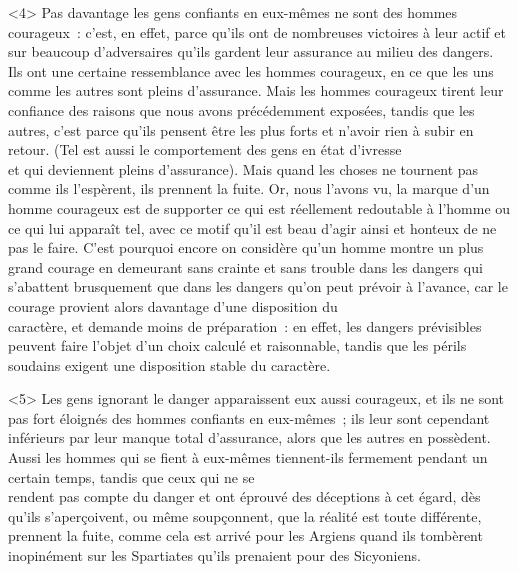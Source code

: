 \documentclass[french,twoside]{book} %
\begin{document}
<4> Pas davantage les gens confiants en eux-mêmes ne sont des hommes courageux : c’est, en effet, parce qu’ils ont de nombreuses victoires à leur actif et sur beaucoup d’adversaires qu’ils gardent leur assurance au milieu des dangers. Ils ont une certaine ressemblance avec les hommes courageux, en ce que les uns comme les autres sont pleins d’assurance. Mais les hommes courageux tirent leur confiance des raisons que nous avons précédemment exposées, tandis que les autres, c’est parce qu’ils pensent être les plus forts et n’avoir rien à subir en retour. (Tel est aussi le comportement des gens en état d’ivresse \\
et qui deviennent pleins d’assurance). Mais quand les choses ne tournent pas comme ils l’espèrent, ils prennent la fuite. Or, nous l’avons vu, la marque d’un homme courageux est de supporter ce qui est réellement redoutable à l’homme ou ce qui lui apparaît tel, avec ce motif qu’il est beau d’agir ainsi et honteux de ne pas le faire. C’est pourquoi encore on considère qu’un homme montre un plus grand courage en demeurant sans crainte et sans trouble dans les dangers qui s’abattent brusquement que dans les dangers qu’on peut prévoir à l’avance, car le courage provient alors davantage d’une disposition du \\
caractère, et demande moins de préparation : en effet, les dangers prévisibles peuvent faire l’objet d’un choix calculé et raisonnable, tandis que les périls soudains exigent une disposition stable du caractère.\par
<5> Les gens ignorant le danger apparaissent eux aussi courageux, et ils ne sont pas fort éloignés des hommes confiants en eux-mêmes ; ils leur sont cependant inférieurs par leur manque total d’assurance, alors que les autres en possèdent. Aussi les hommes qui se fient à eux-mêmes tiennent-ils fermement pendant un certain temps, tandis que ceux qui ne se \\
rendent pas compte du danger et ont éprouvé des déceptions à cet égard, dès qu’ils s’aperçoivent, ou même soupçonnent, que la réalité est toute différente, prennent la fuite, comme cela est arrivé pour les Argiens quand ils tombèrent inopinément sur les Spartiates qu’ils prenaient pour des Sicyoniens.
\end{document}
